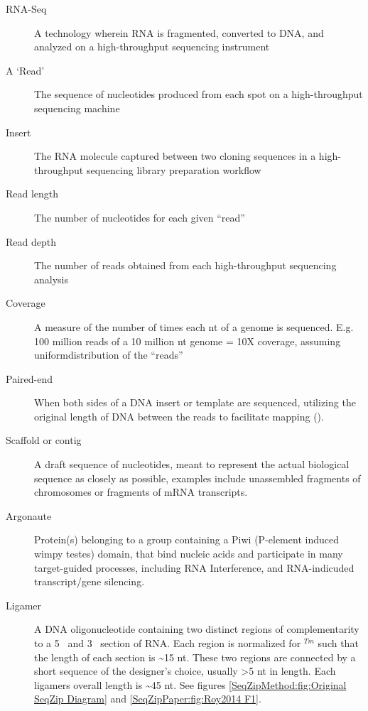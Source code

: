 \label{hd:Definitions} \listDefinitions

\begin{description}
  \item[RNA-Seq] 
  A technology wherein RNA is fragmented, converted to DNA, and analyzed on a high-throughput sequencing instrument

  \item[A ‘Read’]  
  The sequence of nucleotides produced from each spot on a high-throughput sequencing machine

  \item[Insert] 
  The RNA molecule captured between two cloning sequences in a high-throughput sequencing library preparation workflow

  \item[Read length] 
  The number of nucleotides for each given ``read''

  \item[Read depth] 
  The number of reads obtained from each high-throughput sequencing analysis

  \item[Coverage] 
  A measure of the number of times each nt of a genome is sequenced. E.g. 100 million reads of a 10 million nt genome = 10X coverage, assuming uniformdistribution of the ``reads''

  \item[Paired-end] 
  When both sides of a DNA insert or template are sequenced, utilizing the original length of DNA between the reads to facilitate mapping (\cite{Roach1995}).

  \item[Scaffold or contig] 
  A draft sequence of nucleotides, meant to represent the actual biological sequence as closely as possible, examples include unassembled fragments of chromosomes or fragments of mRNA transcripts.

  \item[Argonaute] 
  Protein(s) belonging to a group containing a Piwi (P-element induced wimpy testes) domain, that bind nucleic acids and participate in many target-guided processes, including RNA Interference, and RNA-indicuded transcript/gene silencing.

  \item[Ligamer] 
  A DNA oligonucleotide containing two distinct regions of complementarity to a 5\textprime~ and 3\textprime~ section of RNA. Each region is normalized for $^{Tm}$ such that the length of each section is \textasciitilde15 nt. These two regions are connected by a short sequence of the designer's choice, usually >5 nt in length. Each ligamers overall length is \textasciitilde45 nt. See figures \ref{SeqZipMethod:fig:Original SeqZip Diagram} and \ref{SeqZipPaper:fig:Roy2014 F1}.
  
  \end{description}
  \clearpage %